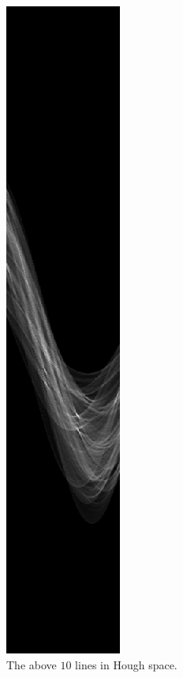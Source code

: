     \begin{figure}[H]
      \centering
      \includegraphics[scale=0.8]{./images/Q8/few256/2.png}
      \caption{The above $10$ lines in Hough space.}
      \label{fig:Q8_few256_2}
    \end{figure}

